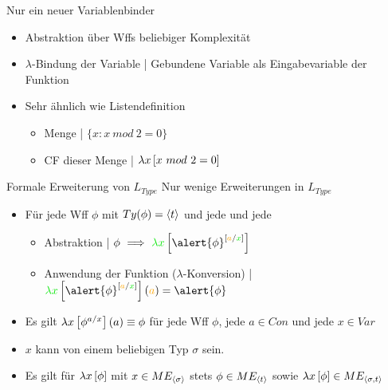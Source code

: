 \begin{frame}
  {Nur ein neuer Variablenbinder}
  \onslide<+->
  \onslide<+->
  \\
  \Halbzeile
  \begin{itemize}[<+->]
    \item Abstraktion über Wffs beliebiger Komplexität
    \item $\lambda$-Bindung der Variable | Gebundene Variable als \alert{Eingabevariable der Funktion}
    \item Sehr ähnlich wie Listendefinition
      \begin{itemize}[<+->]
        \item Menge | \alert{$\{x: x\ mod\ 2=0\}$} 
        \item CF dieser Menge | \alert{$\lambda x\left[{}x\ mod\ 2=0\right]$} 
      \end{itemize}
  \end{itemize}
\end{frame}

\begin{frame}
  {Formale Erweiterung von $L_{Type}$}
  \onslide<+->
  \onslide<+->
  Nur wenige Erweiterungen in $L_{Type}$\\
  \Halbzeile
  \begin{itemize}[<+->]
    \item Für jede Wff $\phi$ mit \alert{$Ty(\phi)={\langle{}t\rangle}$} und jede  und jede 
      \Viertelzeile
      \begin{itemize}[<+->]
        \item Abstraktion | $\phi\ \Longrightarrow\ \gruen{\lambda x}\ekm{\alert{\phi}^{[\orongsch{a}/\gruen{x}]}}$\\
        \item Anwendung der Funktion ($\lambda$-Konversion) | $\gruen{\lambda x}\ekm{\alert{\phi}^{[\orongsch{a}/\gruen{x}]}}(\orongsch{a})=\alert{\phi}$
      \end{itemize}
      \Halbzeile
    \item Es gilt \alert{$\lambda{}x\left[{}\phi^{a/x}\right](a)\equiv{}\phi$} für jede Wff $\phi$, jede $a\in Con$ und jede $x\in{}Var$
    \item $x$ kann von einem \alert{beliebigen Typ $\sigma$} sein.
    \item Es gilt für \alert{$\lambda x\left[{}\phi\right]$} mit $x\in ME_{{\langle{}\sigma\rangle}}$ stets \alert{\alert{$\phi\in ME_{{\langle{}t\rangle}}$}} sowie \alert{$\lambda x\left[{}\phi\right]\in ME_{{\langle{}\sigma,t\rangle}}$}
  \end{itemize}
\end{frame}


